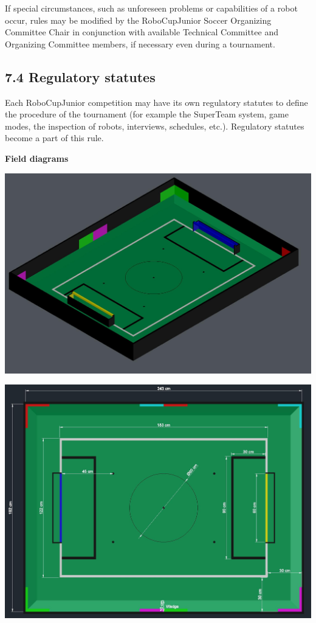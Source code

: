 \documentclass{article}
\begin{document}
If special circumstances, such as unforeseen problems or capabilities of a robot occur, rules may be modified by the RoboCupJunior Soccer Organizing Committee Chair in conjunction with available Technical Committee and Organizing Committee members, if necessary even during a tournament.

\subsection{7.4 Regulatory statutes \label{ref-051}}

Each RoboCupJunior competition may have its own regulatory statutes to define the procedure of the tournament (for example the SuperTeam system, game modes, the inspection of robots, interviews, schedules, etc.). Regulatory statutes become a part of this rule.

\textbf{Field diagrams}

\includegraphics[width=1\textwidth]{media/image5.jpeg}

\includegraphics[width=1\textwidth]{media/image6.jpeg}
\end{document}
